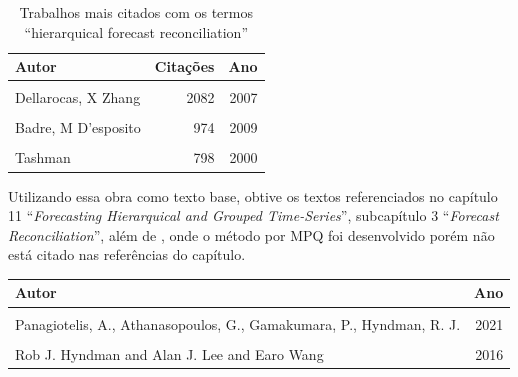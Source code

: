 \documentclass[
  12pt,
  oneside,
  a4paper,
  chapter=TITLE,
  section=TITLE,
  subsubsection=TITLE,
  brazil]{abntex2}
\begin{document}
\begin{table}
\caption{Trabalhos mais citados com os termos ``hierarquical forecast
reconciliation''}\tabularnewline

\centering\begingroup\fontsize{10}{12}\selectfont

\begin{tabular}[t]{lrr}
\toprule
Autor & Citações & Ano\\
\midrule
\cellcolor{gray!6}{Hyndman, G Athanasopoulos} & \cellcolor{gray!6}{5222} & \cellcolor{gray!6}{2018}\\
Dellarocas, X Zhang & 2082 & 2007\\
\cellcolor{gray!6}{Hyndman, A Lee, E Wang, S Wickramasuriya} & \cellcolor{gray!6}{1023} & \cellcolor{gray!6}{2013}\\
Badre, M D'esposito & 974 & 2009\\
\cellcolor{gray!6}{Hong, S Fan} & \cellcolor{gray!6}{912} & \cellcolor{gray!6}{2016}\\
\addlinespace
Tashman & 798 & 2000\\
\bottomrule
\end{tabular}
\endgroup{}
\end{table}

Utilizando essa obra como texto base, obtive os textos referenciados no
capítulo 11 ``\emph{Forecasting Hierarquical and Grouped Time-Series}'',
subcapítulo 3 ``\emph{Forecast Reconciliation}'', além de
\textcite{hyndman2016}, onde o método por MPQ foi desenvolvido porém não
está citado nas referências do capítulo.

\begin{quadro}
\caption{Artigos de referência em Hyndman e Athanasopoulos (2021)}\tabularnewline

\centering\begingroup\fontsize{10}{12}\selectfont

\begin{tabular}[t]{lr}
\toprule
Autor & Ano\\
\midrule
\cellcolor{gray!6}{Hyndman, R. J., Ahmed, R. A., Athanasopoulos, G., Shang, H. L.} & \cellcolor{gray!6}{2011}\\
Panagiotelis, A., Athanasopoulos, G., Gamakumara, P., Hyndman, R. J. & 2021\\
\cellcolor{gray!6}{Wickramasuriya, S. L., Athanasopoulos, G., Hyndman, R. J.} & \cellcolor{gray!6}{2019}\\
Rob J. Hyndman and Alan J. Lee and Earo Wang & 2016\\
\bottomrule
\end{tabular}
\endgroup{}
\end{quadro}
\end{document}
